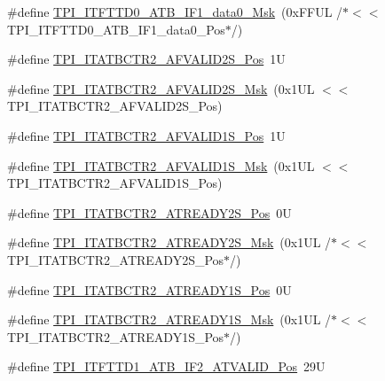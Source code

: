 \begin{DoxyCompactItemize}
\item 
\#define \hyperlink{group___c_m_s_i_s___t_p_i_gafb950b90ccb002e81ae6c44482cd46fd}{T\+P\+I\+\_\+\+I\+T\+F\+T\+T\+D0\+\_\+\+A\+T\+B\+\_\+\+I\+F1\+\_\+data0\+\_\+\+Msk}~(0x\+F\+F\+U\+L /$\ast$$<$$<$ T\+P\+I\+\_\+\+I\+T\+F\+T\+T\+D0\+\_\+\+A\+T\+B\+\_\+\+I\+F1\+\_\+data0\+\_\+\+Pos$\ast$/)
\item 
\#define \hyperlink{group___c_m_s_i_s___t_p_i_ga7b77f85ad8cad3c00b490ca18ba52263}{T\+P\+I\+\_\+\+I\+T\+A\+T\+B\+C\+T\+R2\+\_\+\+A\+F\+V\+A\+L\+I\+D2\+S\+\_\+\+Pos}~1U
\item 
\#define \hyperlink{group___c_m_s_i_s___t_p_i_ga840a62dd0a903c7c0d90214e57f89f6f}{T\+P\+I\+\_\+\+I\+T\+A\+T\+B\+C\+T\+R2\+\_\+\+A\+F\+V\+A\+L\+I\+D2\+S\+\_\+\+Msk}~(0x1\+U\+L $<$$<$ T\+P\+I\+\_\+\+I\+T\+A\+T\+B\+C\+T\+R2\+\_\+\+A\+F\+V\+A\+L\+I\+D2\+S\+\_\+\+Pos)
\item 
\#define \hyperlink{group___c_m_s_i_s___t_p_i_ga15b83625dedbaa8acaab637185cf4fab}{T\+P\+I\+\_\+\+I\+T\+A\+T\+B\+C\+T\+R2\+\_\+\+A\+F\+V\+A\+L\+I\+D1\+S\+\_\+\+Pos}~1U
\item 
\#define \hyperlink{group___c_m_s_i_s___t_p_i_gaf25272d068154278decc987e101bfac7}{T\+P\+I\+\_\+\+I\+T\+A\+T\+B\+C\+T\+R2\+\_\+\+A\+F\+V\+A\+L\+I\+D1\+S\+\_\+\+Msk}~(0x1\+U\+L $<$$<$ T\+P\+I\+\_\+\+I\+T\+A\+T\+B\+C\+T\+R2\+\_\+\+A\+F\+V\+A\+L\+I\+D1\+S\+\_\+\+Pos)
\item 
\#define \hyperlink{group___c_m_s_i_s___t_p_i_gaa94a190da6db605987bb65d4bd76415a}{T\+P\+I\+\_\+\+I\+T\+A\+T\+B\+C\+T\+R2\+\_\+\+A\+T\+R\+E\+A\+D\+Y2\+S\+\_\+\+Pos}~0U
\item 
\#define \hyperlink{group___c_m_s_i_s___t_p_i_ga7530ebf5f4ae263bf9621d901f9840ee}{T\+P\+I\+\_\+\+I\+T\+A\+T\+B\+C\+T\+R2\+\_\+\+A\+T\+R\+E\+A\+D\+Y2\+S\+\_\+\+Msk}~(0x1\+U\+L /$\ast$$<$$<$ T\+P\+I\+\_\+\+I\+T\+A\+T\+B\+C\+T\+R2\+\_\+\+A\+T\+R\+E\+A\+D\+Y2\+S\+\_\+\+Pos$\ast$/)
\item 
\#define \hyperlink{group___c_m_s_i_s___t_p_i_ga52812ab751c370d2d34e55275d896128}{T\+P\+I\+\_\+\+I\+T\+A\+T\+B\+C\+T\+R2\+\_\+\+A\+T\+R\+E\+A\+D\+Y1\+S\+\_\+\+Pos}~0U
\item 
\#define \hyperlink{group___c_m_s_i_s___t_p_i_gabcc13f970f966e62158aea015b910f6b}{T\+P\+I\+\_\+\+I\+T\+A\+T\+B\+C\+T\+R2\+\_\+\+A\+T\+R\+E\+A\+D\+Y1\+S\+\_\+\+Msk}~(0x1\+U\+L /$\ast$$<$$<$ T\+P\+I\+\_\+\+I\+T\+A\+T\+B\+C\+T\+R2\+\_\+\+A\+T\+R\+E\+A\+D\+Y1\+S\+\_\+\+Pos$\ast$/)
\item 
\#define \hyperlink{group___c_m_s_i_s___t_p_i_gae08894135bf256813f4298ba0ea3964c}{T\+P\+I\+\_\+\+I\+T\+F\+T\+T\+D1\+\_\+\+A\+T\+B\+\_\+\+I\+F2\+\_\+\+A\+T\+V\+A\+L\+I\+D\+\_\+\+Pos}~29U

\end{DoxyCompactItemize}
